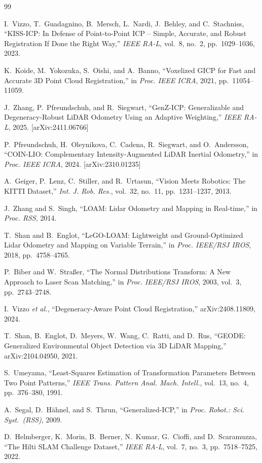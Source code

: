\documentclass[letterpaper, 10pt, conference]{ieeeconf}
\newcommand{\etal}{\textit{et al.}}
\begin{document}

\begin{thebibliography}{99}

I.~Vizzo, T.~Guadagnino, B.~Mersch, L.~Nardi, J.~Behley, and C.~Stachniss,
``KISS-ICP: In Defense of Point-to-Point ICP -- Simple, Accurate, and Robust
Registration If Done the Right Way,''
\textit{IEEE RA-L}, vol.~8, no.~2, pp.~1029--1036, 2023.

K.~Koide, M.~Yokozuka, S.~Oishi, and A.~Banno,
``Voxelized GICP for Fast and Accurate 3D Point Cloud Registration,''
in \textit{Proc. IEEE ICRA}, 2021, pp.~11054--11059.

J.~Zhang, P.~Pfreundschuh, and R.~Siegwart,
``GenZ-ICP: Generalizable and Degeneracy-Robust LiDAR Odometry Using an
Adaptive Weighting,''
\textit{IEEE RA-L}, 2025. [arXiv:2411.06766]

P.~Pfreundschuh, H.~Oleynikova, C.~Cadena, R.~Siegwart, and O.~Andersson,
``COIN-LIO: Complementary Intensity-Augmented LiDAR Inertial Odometry,''
in \textit{Proc. IEEE ICRA}, 2024. [arXiv:2310.01235]

A.~Geiger, P.~Lenz, C.~Stiller, and R.~Urtasun,
``Vision Meets Robotics: The KITTI Dataset,''
\textit{Int. J. Rob. Res.}, vol.~32, no.~11, pp.~1231--1237, 2013.

J.~Zhang and S.~Singh,
``LOAM: Lidar Odometry and Mapping in Real-time,''
in \textit{Proc. RSS}, 2014.

T.~Shan and B.~Englot,
``LeGO-LOAM: Lightweight and Ground-Optimized Lidar Odometry and Mapping
on Variable Terrain,''
in \textit{Proc. IEEE/RSJ IROS}, 2018, pp.~4758--4765.

P.~Biber and W.~Stra{\ss}er,
``The Normal Distributions Transform: A New Approach to Laser Scan Matching,''
in \textit{Proc. IEEE/RSJ IROS}, 2003, vol.~3, pp.~2743--2748.

I.~Vizzo \etal,
``Degeneracy-Aware Point Cloud Registration,''
arXiv:2408.11809, 2024.

T.~Shan, B.~Englot, D.~Meyers, W.~Wang, C.~Ratti, and D.~Rus,
``GEODE: Generalized Environmental Object Detection via 3D LiDAR Mapping,''
arXiv:2104.04950, 2021.

S.~Umeyama,
``Least-Squares Estimation of Transformation Parameters Between Two Point Patterns,''
\textit{IEEE Trans. Pattern Anal. Mach. Intell.}, vol.~13, no.~4, pp.~376--380, 1991.

A.~Segal, D.~H\"{a}hnel, and S.~Thrun,
``Generalized-ICP,''
in \textit{Proc. Robot.: Sci. Syst.\ (RSS)}, 2009.

D.~Helmberger, K.~Morin, B.~Berner, N.~Kumar, G.~Cioffi, and D.~Scaramuzza,
``The Hilti SLAM Challenge Dataset,''
\textit{IEEE RA-L}, vol.~7, no.~3, pp.~7518--7525, 2022.

\end{thebibliography}
\end{document}
